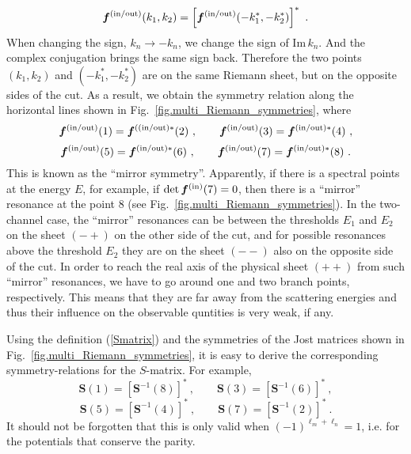 \documentclass[12pt]{article}
\begin{document}
\begin{equation}
\label{multichannel_short_FinCombSym}
      \bm{f}^{\rm (in/out)}(k_1,k_2)=
      \left[\bm{f}^{\rm (in/out)}(-k_1^*,-k_2^*)\right]^*\ .
\end{equation}
When changing the sign, $k_n\to-k_n$, we change the sign of $\mathrm{Im}\,k_n$.
And the complex conjugation brings the same sign back. Therefore the two points
$(k_1,k_2)$ and $(-k_1^*,-k_2^*)$ are on the same
Riemann sheet, but on the opposite sides of the cut. As a result, we obtain the
symmetry relation along the horizontal lines shown in 
Fig.~\ref{fig.multi_Riemann_symmetries}, where 
$$
      \bm{f}^{\rm (in/out)}(1)=
      \bm{f}^{\rm ((in/out)*}(2)\ ,
      \qquad
      \bm{f}^{\rm (in/out)}(3)=
      \bm{f}^{\rm (in/out)*}(4)\ ,
$$
$$
      \bm{f}^{\rm (in/out)}(5)=
      \bm{f}^{\rm (in/out)*}(6)\ ,
      \qquad
      \bm{f}^{\rm (in/out)}(7)=
      \bm{f}^{\rm (in/out)*}(8)\ .
$$
This is known as the ``mirror symmetry''. Apparently, if
there is a spectral points at the energy $E$, for example, if
$\det \bm{f}^{\rm(in)}(7)=0$,
then there is a ``mirror'' resonance at the point $8$ (see 
Fig.~\ref{fig.multi_Riemann_symmetries}).
In the two-channel case, the ``mirror'' resonances can be
between the thresholds $E_1$ and $E_2$ on the sheet $(-+)$ on the other side of
the cut, and for possible resonances above the threshold $E_2$ they are on
the sheet $(--)$ also on the opposite side of the cut. In order to reach
the real axis of the physical sheet $(++)$ from such ``mirror'' resonances,
we have to go around one and two branch points, respectively. This means that
they are far away from the scattering energies and thus their influence on the
observable quntities is very weak, if any.

Using the definition (\ref{Smatrix}) and the symmetries
of the Jost matrices shown in Fig.~\ref{fig.multi_Riemann_symmetries}, it is 
easy to derive the corresponding symmetry-relations for the $S$-matrix. For 
example,
$$
      \bm{S}(1)=
      \left[\bm{S}^{-1}(8)\right]^*\ ,
      \qquad
      \bm{S}(3)=
      \left[\bm{S}^{-1}(6)\right]^*\ ,
$$
$$
      \bm{S}(5)=
      \left[\bm{S}^{-1}(4)\right]^*\ ,
      \qquad
      \bm{S}(7)=
      \left[\bm{S}^{-1}(2)\right]^*\ .
$$
It should not be forgotten that this is only valid when
$(-1)^{\ell_m+\ell_n}=1$, i.e. for the potentials that conserve the parity.

\end{document}
